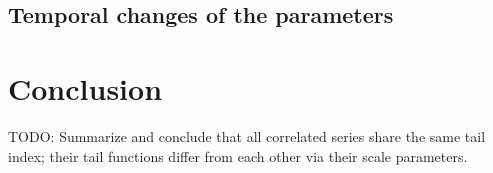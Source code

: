 \documentclass{article}
\newcommand{\1}[1]{
  \mathbf{1}_{\{#1\}}
}
\begin{document}



\subsection{Temporal changes of the parameters}













\section{Conclusion}
TODO: Summarize and conclude that all correlated series share the same
tail index; their tail functions differ from each other via their
scale parameters.



\end{document}
